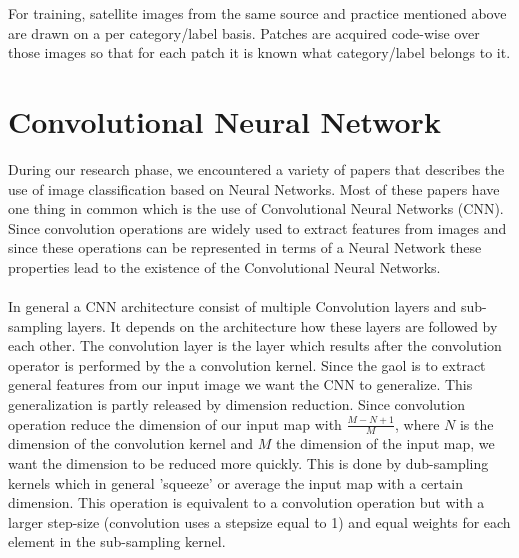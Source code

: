 \documentclass[a4paper,onecolumn]{report}
\begin{document}
For training, satellite images from the same source and practice mentioned above are drawn on a per category/label basis. Patches are acquired code-wise over those images so that for each patch it is known what category/label belongs to it.


\chapter{Convolutional Neural Network}
\label{chap:CNN}
During our research phase, we encountered a variety of papers that describes the use of image classification based on Neural Networks. Most of these papers have one thing in common which is the use of Convolutional Neural Networks (CNN). Since convolution operations are widely used to extract features from images and since these operations can be represented in terms of a Neural Network these properties lead to the existence of the Convolutional Neural Networks. 
\\\\
In general a CNN architecture consist of multiple Convolution layers and sub-sampling layers. It depends on the architecture how these layers are followed by each other. The convolution layer is the layer which results after the convolution operator is performed by the a convolution kernel. Since the gaol is to extract general features from our input image we want the CNN to generalize. This generalization is partly released by dimension reduction. Since convolution operation reduce the dimension of our input map with $\frac{M-N+1}{M}$, where $N$ is the dimension of the convolution kernel and $M$ the dimension of the input map, we want the dimension to be reduced more quickly. This is done by dub-sampling kernels which in general 'squeeze' or average the input map with a certain dimension. This operation is equivalent to a convolution operation but with a larger step-size (convolution uses a stepsize equal to 1) and equal weights for each element in the sub-sampling kernel.
\end{document}
